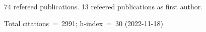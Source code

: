 74 refereed publications. 13 refeered publications as first author.

Total citations~=~2991; h-index~=~30 (2022-11-18)